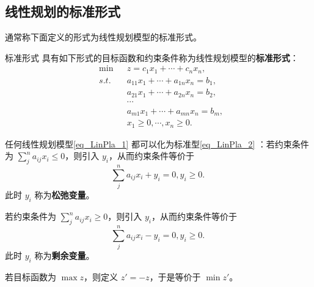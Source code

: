 \subsection{线性规划的标准形式}
通常称下面定义的形式为线性规划模型的标准形式。
\begin{definition}{标准形式}
具有如下形式的目标函数和约束条件称为线性规划模型的\textbf{标准形式}：
\begin{equation}\label{eq_LinPla_2}
\begin{aligned}
&\min  &&z=c_1x_1+\cdots +c_nx_n,\\
&s.t. &&a_{11}x_1+\cdots+a_{1n}x_n=b_1,\\
&&&a_{21}x_1+\cdots+a_{2n}x_n=b_2,\\
&&&\cdots\\
&&&a_{m1}x_1+\cdots+a_{mn}x_n=b_m,\\
&&&x_1\geq0,\cdots,x_n\geq0.
\end{aligned}~
\end{equation}

\end{definition}
任何线性规划模型\autoref{eq_LinPla_1} 都可以化为标准型\autoref{eq_LinPla_2} ：若约束条件为 $\sum_{j}^na_{ij} x_i\leq 0$，则引入 $y_{i}$，从而约束条件等价于
\begin{equation}
\sum_{j}^na_{ij} x_i+y_i= 0,y_i\geq 0.~
\end{equation}
此时 $y_i$ 称为\textbf{松弛变量}。

若约束条件为 $\sum_{j}^na_{ij} x_i\geq 0$，则引入 $y_{i}$，从而约束条件等价于
\begin{equation}
\sum_{j}^na_{ij} x_i-y_i= 0,y_i\geq 0.~
\end{equation}
此时 $y_i$ 称为\textbf{剩余变量}。

若目标函数为 $\max z$，则定义 $z'=-z$，于是等价于 $\min z'$。





